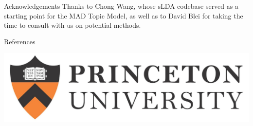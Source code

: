 \documentclass[final]{beamer}
\newlength{\onecolwid}
\begin{document}
\begin{frame}[t]
\begin{columns}[t]
\begin{column}{\onecolwid}


\begin{block}{Acknowledgements}
Thanks to Chong Wang, whose sLDA codebase served as a starting point for the MAD Topic Model, as well as to David Blei for taking the time to consult with us on potential methods.
\end{block}


\begin{block}{References}
\footnotesize



\end{block}

\vspace{-4mm}
\begin{center}
\includegraphics[width=0.5\linewidth]{PU-long.jpg}
\end{center}


\end{column} %

\end{columns} %

\end{frame} %
\end{document}
